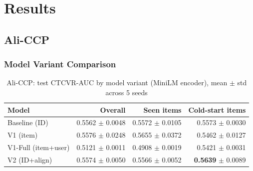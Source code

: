 %
%
%

\chapter{Results}
\label{ch:results}

\section{Ali-CCP}
\label{sec:results-aliccp}

\subsection{Model Variant Comparison}
\label{sec:results-aliccp-main}

\begin{table}[h]
\centering
\caption{Ali-CCP: test CTCVR-AUC by model variant (MiniLM encoder), mean $\pm$ std across 5 seeds}
\label{tab:aliccp-main}
\begin{tabular}{lrrr}
\toprule
Model & Overall & Seen items & Cold-start items \\
\midrule
Baseline (ID)  & 0.5562 $\pm$ 0.0048 & 0.5572 $\pm$ 0.0105 & 0.5573 $\pm$ 0.0030 \\
V1 (item)      & 0.5576 $\pm$ 0.0248 & 0.5655 $\pm$ 0.0372 & 0.5462 $\pm$ 0.0127 \\
V1-Full (item+user) & 0.5121 $\pm$ 0.0011 & 0.4908 $\pm$ 0.0019 & 0.5421 $\pm$ 0.0031 \\
V2 (ID+align)  & 0.5574 $\pm$ 0.0050 & 0.5566 $\pm$ 0.0052 & \textbf{0.5639} $\pm$ 0.0089 \\
\bottomrule
\end{tabular}
\end{table}

